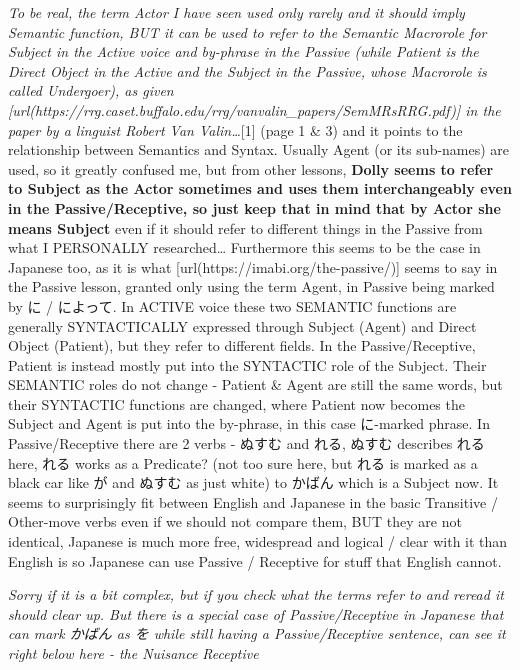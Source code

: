 {\em To be real, the term Actor I have seen used only rarely and it should imply Semantic function, BUT it can be used to refer to the Semantic Macrorole for Subject in the Active voice and by-phrase in the Passive (while Patient is the Direct Object in the Active and the Subject in the Passive, whose Macrorole is called Undergoer), as given [url(https://rrg.caset.buffalo.edu/rrg/vanvalin_papers/SemMRsRRG.pdf)] in the paper by a linguist Robert Van Valin\ldots{}}{[}1{]} (page 1 & 3) and it points to the relationship between Semantics and Syntax. Usually Agent (or its sub-names) are used, so it greatly confused me, but from other lessons, {\bf Dolly seems to refer to Subject as the Actor sometimes and uses them interchangeably even in the Passive/Receptive, so just keep that in mind that by Actor she means Subject} even if it should refer to different things in the Passive from what I PERSONALLY researched\ldots{}\crlf
Furthermore this seems to be the case in Japanese too, as it is what [url(https://imabi.org/the-passive/)] seems to say in the Passive lesson, granted only using the term Agent, in Passive being marked by に / によって.\crlf
In ACTIVE voice these two SEMANTIC functions are generally SYNTACTICALLY expressed through Subject (Agent) and Direct Object (Patient), but they refer to different fields.\crlf
In the Passive/Receptive, Patient is instead mostly put into the SYNTACTIC role of the Subject.\crlf
Their SEMANTIC roles do not change - Patient & Agent are still the same words, but their SYNTACTIC functions are changed, where Patient now becomes the Subject and Agent is put into the by-phrase, in this case に-marked phrase. In Passive/Receptive there are 2 verbs - ぬすむ and れる, ぬすむ describes れる here, れる works as a Predicate? (not too sure here, but れる is marked as a black car like が and ぬすむ as just white) to かばん which is a Subject now.\crlf
It seems to surprisingly fit between English and Japanese in the basic Transitive / Other-move verbs even if we should not compare them, BUT they are not identical, Japanese is much more free, widespread and logical / clear with it than English is so Japanese can use Passive / Receptive for stuff that English cannot.

{\em Sorry if it is a bit complex, but if you check what the terms refer to and reread it should clear up.\crlf
But there is a special case of Passive/Receptive in Japanese that can mark かばん as を while still having a Passive/Receptive sentence, can see it right below here - the Nuisance Receptive}

